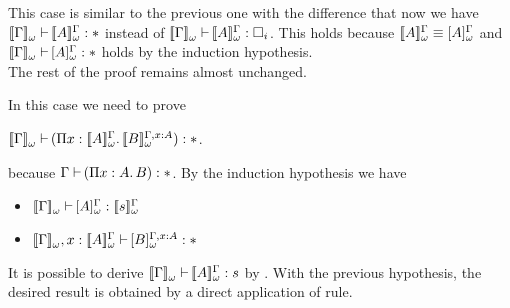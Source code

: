 \begin{Proof}

\begin{ProofCase}{\CicPropProd}
This case is similar to the previous one with the difference that now we have
$$ instead of
$$. This holds
because $ \equiv {}$ 
and $$ holds by the induction
hypothesis. \\
The rest of the proof remains almost unchanged.
\end{ProofCase}

\begin{ProofCase}{\CicImpred}
In this case we need to prove
\begin{center}
$$. 
\end{center}
because $$. By the induction hypothesis we have
\begin{itemize}
\item $$
\item $$
\end{itemize}
It is possible to derive $$ by 
.
With the previous hypothesis, the desired result is obtained by a direct application of 
\CicImpred{} rule.
\end{ProofCase}


\end{Proof}
